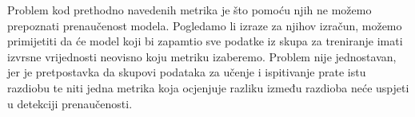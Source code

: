    

Problem kod prethodno navedenih metrika je što pomoću njih ne možemo prepoznati prenaučenost modela. Pogledamo li izraze za njihov izračun, možemo primijetiti da će model koji bi zapamtio sve podatke iz skupa za treniranje imati izvrsne vrijednosti neovisno koju metriku izaberemo. Problem nije jednostavan, jer je pretpostavka da skupovi podataka za učenje i ispitivanje prate istu razdiobu te niti jedna metrika koja ocjenjuje razliku između razdioba neće uspjeti u detekciji prenaučenosti.
   